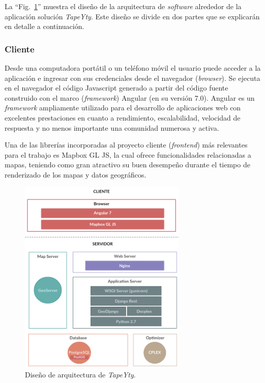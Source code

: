 La ``Fig.~\ref{fig:disenhoArquitectura}'' muestra el diseño de la arquitectura de \textit{software} alrededor de la aplicación solución \textit{TapeYty}. Este diseño se divide en dos partes que se explicarán en detalle a continuación.

\subsubsection{Cliente}

Desde una computadora portátil o un teléfono móvil el usuario puede acceder a la aplicación e ingresar con sus credenciales desde el navegador (\textit{browser}). Se ejecuta en el navegador el código Javascript generado a partir del código fuente construido con el marco (\textit{framework}) Angular (en su versión 7.0). Angular es un \textit{framework} ampliamente utilizado para el desarrollo de aplicaciones web con excelentes prestaciones en cuanto a rendimiento, escalabilidad, velocidad de respuesta y no menos importante una comunidad numerosa y activa. 

Una de las librerías incorporadas al proyecto cliente (\textit{frontend}) más relevantes para el trabajo es Mapbox GL JS, la cual ofrece funcionalidades relacionadas a mapas, teniendo como gran atractivo su buen desempeño durante el tiempo de renderizado de los mapas y datos geográficos.

\begin{figure}[tbp]
\centerline{\includegraphics[width=8cm]{20190424_WebAppArchitectureDesign.png}}
\caption{Diseño de arquitectura de \textit{TapeYty}.}
\label{fig:disenhoArquitectura}
\end{figure}

